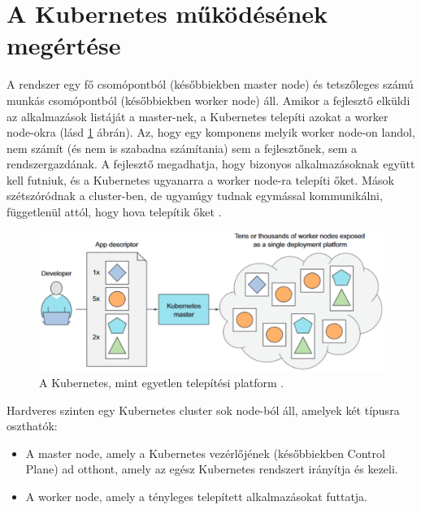\section{A Kubernetes működésének megértése}
A rendszer egy fő csomópontból (későbbiekben master node) és tetszőleges számú munkás csomópontból (későbbiekben worker node) áll.
Amikor a fejlesztő elküldi az alkalmazások listáját a master-nek, a Kubernetes telepíti azokat a worker node-okra (lásd \ref{kubernetes-overview} ábrán).
Az, hogy egy komponens melyik worker node-on landol, nem számít (és nem is szabadna számítania) sem a fejlesztőnek, sem a rendszergazdának.
A fejlesztő megadhatja, hogy bizonyos alkalmazásoknak együtt kell futniuk, és a Kubernetes ugyanarra a worker node-ra telepíti őket.
Mások szétszóródnak a cluster-ben, de ugyanúgy tudnak egymással kommunikálni, függetlenül attól, hogy hova telepítik őket \cite{Marko17}.

\begin{figure}[ht]
    \centering
         \includegraphics[width=1.0\textwidth]{figures/kubernetes/kubernetes-overview.png}
          \caption{A Kubernetes, mint egyetlen telepítési platform \cite{Marko17}.}
           \label{kubernetes-overview}
\end{figure}

Hardveres szinten egy Kubernetes cluster sok node-ból áll, amelyek két típusra oszthatók:
\begin{itemize}
    \item A master node, amely a Kubernetes vezérlőjének (későbbiekben Control Plane) ad otthont, amely az egész Kubernetes rendszert irányítja és kezeli.
    \item A worker node, amely a tényleges telepített alkalmazásokat futtatja.
\end{itemize}

\newpage

